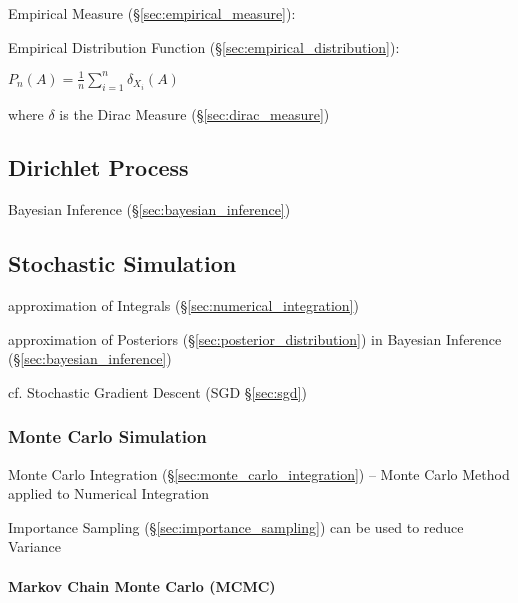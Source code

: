 Empirical Measure (\S\ref{sec:empirical_measure}):

Empirical Distribution Function (\S\ref{sec:empirical_distribution}):

$P_n(A) = \frac{1}{n}\sum_{i=1}^n \delta_{X_i}(A)$

where $\delta$ is the Dirac Measure (\S\ref{sec:dirac_measure})



\subsection{Dirichlet Process}\label{sec:dirichlet_process}

Bayesian Inference (\S\ref{sec:bayesian_inference})



\subsection{Stochastic Simulation}\label{sec:stochastic_simulation}

approximation of Integrals (\S\ref{sec:numerical_integration})

approximation of Posteriors (\S\ref{sec:posterior_distribution}) in Bayesian
Inference (\S\ref{sec:bayesian_inference})

cf. Stochastic Gradient Descent (SGD \S\ref{sec:sgd})



\subsubsection{Monte Carlo Simulation}\label{sec:monte_carlo}

Monte Carlo Integration (\S\ref{sec:monte_carlo_integration}) -- Monte Carlo
Method applied to Numerical Integration

Importance Sampling (\S\ref{sec:importance_sampling}) can be used to reduce
Variance



\paragraph{Markov Chain Monte Carlo (MCMC)}\label{sec:mcmc}\hfill

